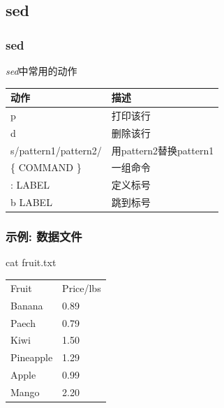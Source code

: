 \documentclass[compress]{beamer}
\begin{document}
\subsection{sed}

\begin{frame}
\frametitle{sed}

\emph{sed}中常用的动作\\[1ex]

\begin{tabular}{p{5cm}l}\hline
动作 & 描述 \\ \hline
p & 打印该行 \\
d & 删除该行 \\
s/pattern1/pattern2/ & 用pattern2替换pattern1 \\
\{ COMMAND \} & 一组命令 \\
: LABEL & 定义标号 \\
b LABEL & 跳到标号 \\ \hline

\end{tabular}


\end{frame}


\begin{frame}
\frametitle{示例: 数据文件}

{cat fruit.txt}\\[1ex]
\begin{tabular}{p{2cm}l}
Fruit & Price/lbs \\
Banana & 0.89 \\
Paech & 0.79 \\
Kiwi & 1.50 \\
Pineapple & 1.29 \\
Apple & 0.99 \\
Mango & 2.20 \\
\end{tabular}

\end{frame}
\end{document}
